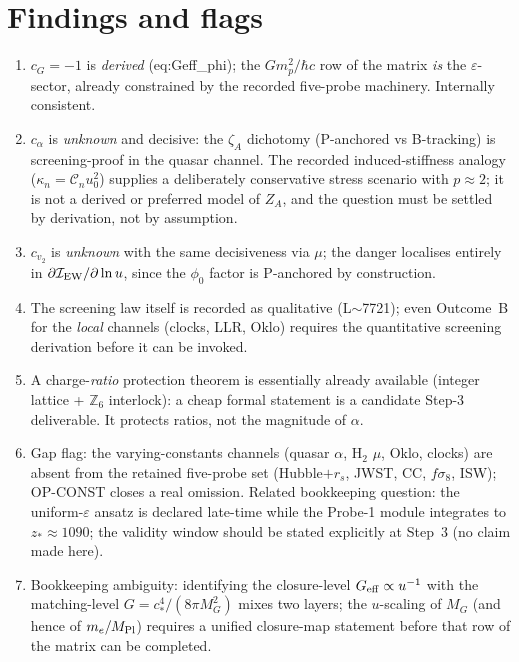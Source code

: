 \documentclass[11pt,a4paper]{article}
\begin{document}
\section{Findings and flags}
\begin{enumerate}[leftmargin=1.8em,itemsep=2pt,label=\textbf{F\arabic*.}]
\item $c_G=-1$ is \emph{derived} (eq:Geff\_phi); the $Gm_p^2/\hbar c$ row of the
matrix \emph{is} the $\varepsilon$-sector, already constrained by the recorded
five-probe machinery. Internally consistent.
\item $c_\alpha$ is \emph{unknown} and decisive: the $\zeta_A$ dichotomy
(P-anchored vs B-tracking) is screening-proof in the quasar channel. The recorded
induced-stiffness analogy ($\kappa_n=\mathcal C_n u_0^2$) supplies a deliberately conservative stress scenario with
$p\approx2$; it is not a derived or preferred model of $Z_A$, and the question must
be settled by derivation, not by assumption.
\item $c_{v_2}$ is \emph{unknown} with the same decisiveness via $\mu$; the danger
localises entirely in $\partial\mathcal I_{\rm EW}/\partial\ln u$, since the
$\phi_0$ factor is P-anchored by construction.
\item The screening law itself is recorded as qualitative (L$\sim$7721); even
Outcome~B for the \emph{local} channels (clocks, LLR, Oklo) requires the
quantitative screening derivation before it can be invoked.
\item A charge-\emph{ratio} protection theorem is essentially already available
(integer lattice + $\mathbb Z_6$ interlock): a cheap formal statement is a
candidate Step-3 deliverable. It protects ratios, not the magnitude of $\alpha$.
\item Gap flag: the varying-constants channels (quasar $\alpha$, H$_2$ $\mu$,
Oklo, clocks) are absent from the retained five-probe set (Hubble$+r_s$, JWST, CC,
$f\sigma_8$, ISW); OP-CONST closes a real omission. Related bookkeeping question:
the uniform-$\varepsilon$ ansatz is declared late-time while the Probe-1 module
integrates to $z_*\approx1090$; the validity window should be stated explicitly at
Step~3 (no claim made here).
\item Bookkeeping ambiguity: identifying the closure-level $G_{\rm eff}\propto
u^{-1}$ with the matching-level $G=c_*^4/(8\pi M_G^2)$ mixes two layers; the
$u$-scaling of $M_G$ (and hence of $m_e/M_{\rm Pl}$) requires a unified closure-map
statement before that row of the matrix can be completed.
\end{enumerate}
\end{document}
